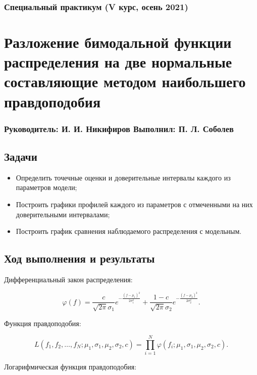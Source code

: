 \documentclass[a4paper, oneside]{article}
\newcommand{\sd}{\vspace{0.5em}}
\begin{document}
\subsubsection*{Специальный практикум (V курс, осень 2021)}
\section*{Разложение бимодальной функции распределения на две нормальные составляющие методом наибольшего правдоподобия}
\subsubsection*{Руководитель: И. И. Никифиров \hspace{2em} Выполнил: П. Л. Соболев}

\vspace{3em}

\subsection*{Задачи}

\begin{itemize}
  \setlength\itemsep{-0.1em}
  \item Определить точечные оценки и доверительные интервалы каждого из параметров модели;
  \item Построить графики профилей каждого из параметров с отмеченными на них доверительными интервалами;
  \item Построить график сравнения наблюдаемого распределения с модельным.
\end{itemize}

\subsection*{Ход выполнения и результаты}

Дифференциальный закон распределения:

$$
\varphi(f) = \frac{c}{\sqrt{2 \pi} \sigma_1} e^{\displaystyle -\frac{(f - \mu_1)^2}{2 \sigma_1^2}} + \frac{1 - c}{\sqrt{2 \pi} \sigma_2} e^{\displaystyle -\frac{(f - \mu_2)^2}{2 \sigma_2^2}}.
$$
\sd

Функция правдоподобия:

$$
L(f_1, f_2, \ldots, f_N; \mu_1, \sigma_1, \mu_2, \sigma_2, c) = \prod_{i=1}^{N} \varphi(f_i; \mu_1, \sigma_1, \mu_2, \sigma_2, c).
$$

Логарифмическая функция правдоподобия:
\end{document}
